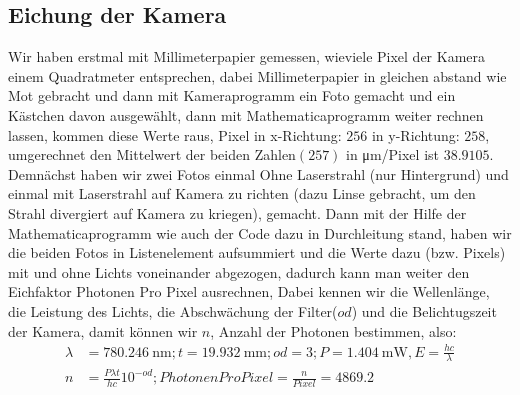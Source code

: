 \documentclass[12pt, a4paper]{article}
\begin{document}
  \subsection{Eichung der Kamera}
  \label{eichung}
  Wir haben erstmal mit Millimeterpapier gemessen, wieviele Pixel der Kamera einem Quadratmeter entsprechen, dabei Millimeterpapier in gleichen abstand wie Mot gebracht und dann mit Kameraprogramm ein Foto gemacht und ein Kästchen davon ausgewählt, dann mit Mathematicaprogramm weiter rechnen lassen, kommen diese Werte raus, Pixel in x-Richtung: $256$ in y-Richtung: $258$, umgerechnet den Mittelwert der beiden Zahlen$(257)$ in \si{\micro\m/Pixel} ist $38.9105$.\\
  Demnächst haben wir zwei Fotos einmal Ohne Laserstrahl (nur Hintergrund) und einmal mit Laserstrahl auf Kamera zu richten (dazu Linse gebracht, um den Strahl divergiert auf Kamera zu kriegen), gemacht. Dann mit der Hilfe der Mathematicaprogramm wie auch der Code dazu in Durchleitung stand, haben wir die beiden Fotos in Listenelement aufsummiert und die Werte dazu (bzw. Pixels) mit und ohne Lichts voneinander abgezogen, dadurch kann man weiter den Eichfaktor Photonen Pro Pixel ausrechnen, Dabei kennen wir die Wellenlänge, die Leistung des Lichts, die Abschwächung der Filter($od$) und die Belichtugszeit der Kamera, damit können wir $n$, Anzahl der Photonen bestimmen, also:\\
  \begin{align*}
  \lambda &=\SI{780.246}{\nano\m} ; t=\SI{19.932}{\milli\m} ; od=3 ; P=\SI{1.404}{\milli\W} , E=\frac{h c}{\lambda} \\
  n&=\frac{P \lambda t}{h c} 10^{-od} ; Photonen Pro Pixel=\frac{n}{Pixel}=4869.2
  \end{align*}
\end{document}
